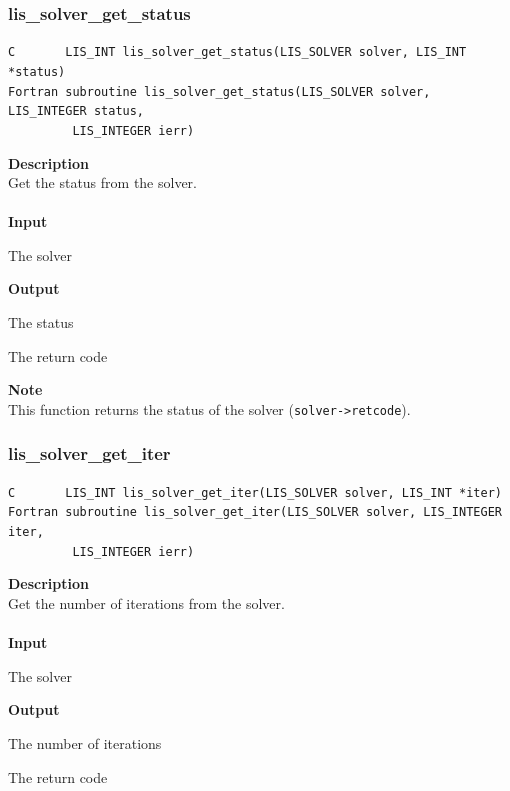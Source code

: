 \documentclass[a4paper]{article}
\newcommand{\namelistlabel}[1]{\mbox{#1}\hfill}
\newenvironment{namelist}[1]{%
\begin{list}{}
  {\let\makelabel\namelistlabel
  \settowidth{\labelwidth}{#1}
  \setlength{\leftmargin}{1.1\labelwidth}}
  }{%
\end{list}}
\begin{document}
\newpage
\subsubsection{lis\_solver\_get\_status}
\begin{screen}
\verb|C       LIS_INT lis_solver_get_status(LIS_SOLVER solver, LIS_INT *status)|\\
\verb|Fortran subroutine lis_solver_get_status(LIS_SOLVER solver, LIS_INTEGER status,|\\
\verb|         LIS_INTEGER ierr)|
\end{screen}
{\bf Description}\\
\indent
Get the status from the solver.
\\ \\
\noindent
{\bf Input}
\begin{namelist}{XXXXXXXXXXXXXXXXXXXX}
\item[\tt solver] The solver
\end{namelist}
{\bf Output}
\begin{namelist}{XXXXXXXXXXXXXXXXXXXX}
\item[\tt status] The status
\item[\tt ierr] The return code
\end{namelist}
{\bf Note}\\
\indent
This function returns the status of the solver ({\tt solver->retcode}).

\subsubsection{lis\_solver\_get\_iter}
\begin{screen}
\verb|C       LIS_INT lis_solver_get_iter(LIS_SOLVER solver, LIS_INT *iter)|\\
\verb|Fortran subroutine lis_solver_get_iter(LIS_SOLVER solver, LIS_INTEGER iter,|\\
\verb|         LIS_INTEGER ierr)|
\end{screen}
{\bf Description}\\
\indent
Get the number of iterations from the solver.
\\ \\
\noindent
{\bf Input}
\begin{namelist}{XXXXXXXXXXXXXXXXXXXX}
\item[\tt solver] The solver
\end{namelist}
{\bf Output}
\begin{namelist}{XXXXXXXXXXXXXXXXXXXX}
\item[\tt iter] The number of iterations
\item[\tt ierr] The return code
\end{namelist}
\end{document}
